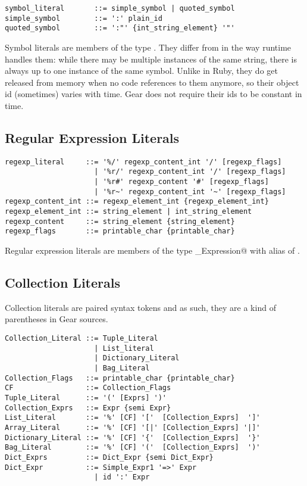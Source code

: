 \syntax\begin{lstlisting}
symbol_literal       ::= simple_symbol | quoted_symbol
simple_symbol        ::= ':' plain_id
quoted_symbol        ::= ':"' {int_string_element} '"'
\end{lstlisting}

Symbol literals are members of the type \lstinline@Symbol@. They differ from  in the way runtime handles them: while there may be multiple instances of the same string, there is always up to one instance of the same symbol. Unlike in Ruby, they do get released from memory when no code references to them anymore, so their object id (sometimes) varies with time. Gear does not require their ids to be constant in time. 









\subsection{Regular Expression Literals}\label{sec:regexpliterals}

\syntax\begin{lstlisting}
regexp_literal     ::= '%/' regexp_content_int '/' [regexp_flags]
	                 | '%r/' regexp_content_int '/' [regexp_flags]
	                 | '%r#' regexp_content '#' [regexp_flags]
	                 | '%r~' regexp_content_int '~' [regexp_flags]
regexp_content_int ::= regexp_element_int {regexp_element_int}
regexp_element_int ::= string_element | int_string_element
regexp_content     ::= string_element {string_element}
regexp_flags       ::= printable_char {printable_char}
\end{lstlisting}

Regular expression literals are members of the type \lstinline@Regular_Expression@ with alias of \lstinline@Regexp@. 






\subsection{Collection Literals}\label{sec:collectionliterals}

Collection literals are paired syntax tokens and as such, they are a kind of parentheses in Gear sources. 

\syntax\begin{lstlisting}
Collection_Literal ::= Tuple_Literal
	                 | List_literal
	                 | Dictionary_Literal
	                 | Bag_Literal
Collection_Flags   ::= printable_char {printable_char}
CF                 ::= Collection_Flags
Tuple_Literal      ::= '(' [Exprs] ')'
Collection_Exprs   ::= Expr {semi Expr}
List_Literal       ::= '%' [CF] '['  [Collection_Exprs]  ']'
Array_Literal      ::= '%' [CF] '[|' [Collection_Exprs] '|]'
Dictionary_Literal ::= '%' [CF] '{'  [Collection_Exprs]  '}'
Bag_Literal        ::= '%' [CF] '('  [Collection_Exprs]  ')'
Dict_Exprs         ::= Dict_Expr {semi Dict_Expr}
Dict_Expr          ::= Simple_Expr1 '=>' Expr
	                 | id ':' Expr
\end{lstlisting}

